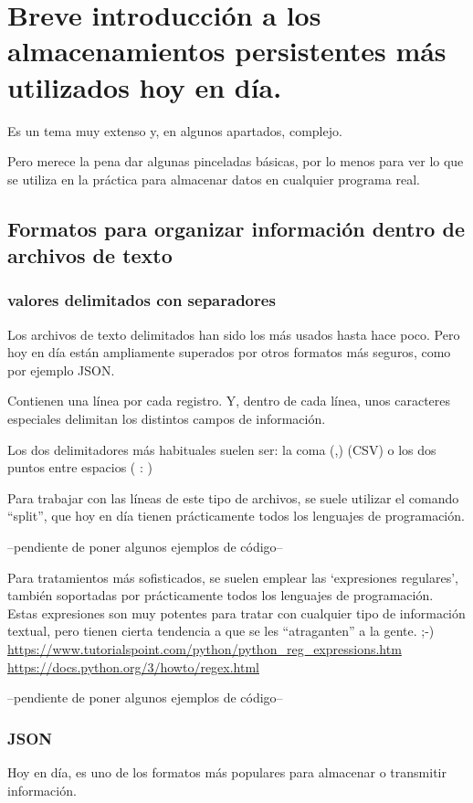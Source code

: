\documentclass[spanish,12pt,a4paper,final,oneside]{book}
\begin{document}
\chapter{Breve introducción a los almacenamientos persistentes más utilizados hoy en día.}
Es un tema muy extenso y, en algunos apartados, complejo.

Pero merece la pena dar algunas pinceladas básicas, por lo menos para ver lo que se utiliza en la práctica para almacenar datos en cualquier programa real.

\section{Formatos para organizar información dentro de  archivos de texto}


\subsection{valores delimitados con separadores}
Los archivos de texto delimitados han sido los más usados hasta hace poco. Pero hoy en día están ampliamente superados por otros formatos más seguros, como por ejemplo JSON.

Contienen una línea por cada registro. Y, dentro de cada línea, unos caracteres especiales delimitan los distintos campos de información.

Los dos delimitadores más habituales suelen ser: la coma (,) (CSV)  o  los dos puntos entre espacios ( : )

Para trabajar con las líneas de este tipo de archivos, se suele utilizar el comando ``split'', que hoy en día tienen prácticamente todos los lenguajes de programación.

--pendiente de poner algunos ejemplos de código--

Para tratamientos más sofisticados, se suelen emplear las `expresiones regulares', también soportadas por prácticamente todos los lenguajes de programación.
\\Estas expresiones son muy potentes para tratar con cualquier tipo de información textual, pero tienen cierta tendencia a que se les ``atraganten'' a la gente.  ;-)
\\ \url{https://www.tutorialspoint.com/python/python_reg_expressions.htm}
\\ \url{https://docs.python.org/3/howto/regex.html}

--pendiente de poner algunos ejemplos de código--


\subsection{JSON}
Hoy en día, es uno de los formatos más populares para almacenar o transmitir información.
\end{document}
